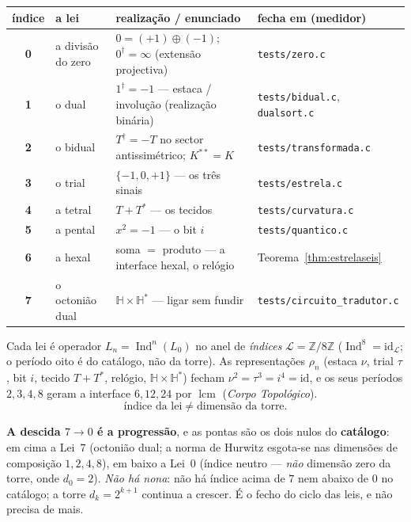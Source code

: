 \documentclass[11pt,a4paper]{article}
\newcommand{\code}[1]{\texttt{\small #1}}
\newcommand{\dg}{^{\dagger}}
\begin{document}
\begin{center}\small
\begin{tabular}{@{}clll@{}}
\toprule
índice & a lei & realização / enunciado & fecha em (medidor) \\
\midrule
\textbf{0} & a divisão do zero & $0=(+1)\oplus(-1)$; $0\dg=\infty$ (extensão projectiva) & \code{tests/zero.c} \\
\textbf{1} & o dual & $1\dg=-1$ --- estaca / involução (realização binária) & \code{tests/bidual.c}, \code{dualsort.c} \\
\textbf{2} & o bidual & $T\dg=-T$ no sector antissimétrico; $K^{**}=K$ & \code{tests/transformada.c} \\
\textbf{3} & o trial & $\{-1,0,+1\}$ --- os três sinais & \code{tests/estrela.c} \\
\textbf{4} & a tetral & $T+T^{*}$ --- os tecidos & \code{tests/curvatura.c} \\
\textbf{5} & a pental & $x^2=-1$ --- o bit $i$ & \code{tests/quantico.c} \\
\textbf{6} & a hexal & soma $=$ produto --- a interface hexal, o relógio & Teorema~\ref{thm:estrelaseis} \\
\textbf{7} & o octonião dual & $\mathbb{H}\times\mathbb{H}^{*}$ --- ligar sem fundir & \code{tests/circuito\_tradutor.c} \\
\bottomrule
\end{tabular}
\end{center}

\noindent Cada lei é operador $L_n=\operatorname{Ind}^{n}(L_0)$ no anel de
\emph{índices} $\mathcal L=\mathbb{Z}/8\mathbb{Z}$
(\(\operatorname{Ind}^{8}=\mathrm{id}_{\mathcal L}\); o período oito é do
catálogo, não da torre). As representações $\rho_n$ (estaca $\nu$, trial $\tau$,
bit $i$, tecido $T{+}T^{*}$, relógio, $\mathbb{H}{\times}\mathbb{H}^{*}$)
fecham $\nu^{2}=\tau^{3}=i^{4}=\mathrm{id}$, e os seus períodos $2,3,4,8$
geram a interface $6,12,24$ por $\operatorname{lcm}$
(\emph{Corpo Topológico}).
\[
\boxed{\text{índice da lei}\neq\text{dimensão da torre}.}
\]

\noindent \textbf{A descida $7\to0$ é a progressão}, e as pontas são os dois nulos do
\textbf{catálogo}: em cima a Lei~$7$ (octonião dual; a norma de Hurwitz esgota-se nas
dimensões de composição $1,2,4,8$), em baixo a Lei~$0$ (índice neutro --- \emph{não}
dimensão zero da torre, onde $d_0=2$). \emph{Não há nona}: não há índice acima de $7$
nem abaixo de $0$ no catálogo; a torre $d_k=2^{k+1}$ continua a crescer. É o fecho do
ciclo das leis, e não precisa de mais.
\end{document}
